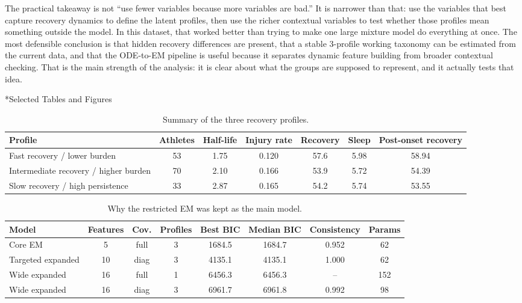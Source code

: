 \documentclass[11pt]{article}
\makeatletter
\renewcommand\section{\@startsection{section}{1}{0pt}{0.38em}{0.14em}{\bfseries\normalsize}}
\makeatother
\begin{document}
The practical takeaway is not ``use fewer variables because more variables are bad.'' It is narrower than that: use the variables that best capture recovery dynamics to define the latent profiles, then use the richer contextual variables to test whether those profiles mean something outside the model. In this dataset, that worked better than trying to make one large mixture model do everything at once. The most defensible conclusion is that hidden recovery differences are present, that a stable 3-profile working taxonomy can be estimated from the current data, and that the ODE-to-EM pipeline is useful because it separates dynamic feature building from broader contextual checking. That is the main strength of the analysis: it is clear about what the groups are supposed to represent, and it actually tests that idea.

\clearpage
\section*{Selected Tables and Figures}

\begin{table}[H]
\centering
\scriptsize
\caption{Summary of the three recovery profiles.}
\label{tab:primary-summary}
\begin{tabular}{@{}lcccccc@{}}
\toprule
\textbf{Profile} & \textbf{Athletes} & \textbf{Half-life} & \textbf{Injury rate} & \textbf{Recovery} & \textbf{Sleep} & \textbf{Post-onset recovery} \\
\midrule
Fast recovery / lower burden & 53 & 1.75 & 0.120 & 57.6 & 5.98 & 58.94 \\
Intermediate recovery / higher burden & 70 & 2.10 & 0.166 & 53.9 & 5.72 & 54.39 \\
Slow recovery / high persistence & 33 & 2.87 & 0.165 & 54.2 & 5.74 & 53.55 \\
\bottomrule
\end{tabular}
\end{table}

\begin{table}[H]
\centering
\scriptsize
\caption{Why the restricted EM was kept as the main model.}
\label{tab:model-compare}
\begin{tabular}{@{}lccccccc@{}}
\toprule
\textbf{Model} & \textbf{Features} & \textbf{Cov.} & \textbf{Profiles} & \textbf{Best BIC} & \textbf{Median BIC} & \textbf{Consistency} & \textbf{Params} \\
\midrule
Core EM & 5 & full & 3 & 1684.5 & 1684.7 & 0.952 & 62 \\
Targeted expanded & 10 & diag & 3 & 4135.1 & 4135.1 & 1.000 & 62 \\
Wide expanded & 16 & full & 1 & 6456.3 & 6456.3 & -- & 152 \\
Wide expanded & 16 & diag & 3 & 6961.7 & 6961.8 & 0.992 & 98 \\
\bottomrule
\end{tabular}
\end{table}
\end{document}
